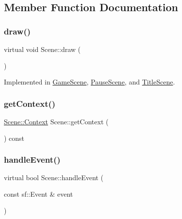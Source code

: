 \subsection{Member Function Documentation}
\hypertarget{class_scene_a789c16961aa1e316b2a4a05b95187546}{}\label{class_scene_a789c16961aa1e316b2a4a05b95187546} 
\subsubsection{\texorpdfstring{draw()}{draw()}}
{\footnotesize\ttfamily virtual void Scene\+::draw (\begin{DoxyParamCaption}{ }\end{DoxyParamCaption})\hspace{0.3cm}{\ttfamily [pure virtual]}}



Implemented in \hyperlink{class_game_scene_ae9eb60cbb8fa55eeb07b951e3d83f426}{Game\+Scene}, \hyperlink{class_pause_scene_abfd1398a064a83b3ae6ac5fd98aebf05}{Pause\+Scene}, and \hyperlink{class_title_scene_a3e527255771f75a41c4fe8aaa35999dd}{Title\+Scene}.

\hypertarget{class_scene_acab4ecf24b21ffa8e423a8e4fd45c491}{}\label{class_scene_acab4ecf24b21ffa8e423a8e4fd45c491} 
\subsubsection{\texorpdfstring{get\+Context()}{getContext()}}
{\footnotesize\ttfamily \hyperlink{struct_scene_1_1_context}{Scene\+::\+Context} Scene\+::get\+Context (\begin{DoxyParamCaption}{ }\end{DoxyParamCaption}) const\hspace{0.3cm}{\ttfamily [protected]}}

\hypertarget{class_scene_af25e4d2c998aca4e95899fb67488e815}{}\label{class_scene_af25e4d2c998aca4e95899fb67488e815} 
\subsubsection{\texorpdfstring{handle\+Event()}{handleEvent()}}
{\footnotesize\ttfamily virtual bool Scene\+::handle\+Event (\begin{DoxyParamCaption}\item[{const sf\+::\+Event \&}]{event }\end{DoxyParamCaption})\hspace{0.3cm}{\ttfamily [pure virtual]}}




